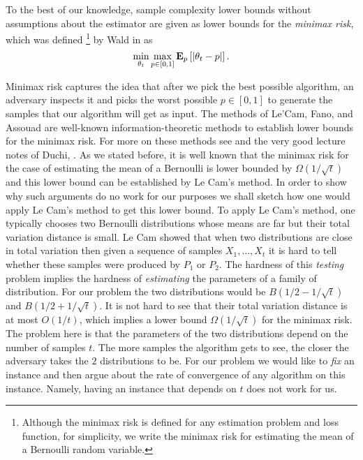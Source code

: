 
To the best of our knowledge, sample complexity lower bounds without
assumptions about the estimator are given as lower bounds for the
\emph{minimax risk}, which was defined
\footnote{
  Although the minimax risk is defined for any estimation problem and loss
  function, for simplicity, we write the minimax risk for estimating the mean
  of a Bernoulli random variable.}
by Wald in \cite{Wal39} as
\[
  \min_{\theta_t} \max_{p\in[0,1]} \bm{\mathrm{E}}_{p} \left[ |\theta_t - p| \right].
\]

Minimax risk captures the idea that after we pick the best possible
algorithm, an adversary inspects it and picks the worst possible
$p \in[0,1]$ to generate the samples that our algorithm will get as input.
The methods of Le'Cam, Fano, and Assouad are well-known
information-theoretic methods to establish lower bounds for the minimax risk.
For more on these methods see \cite{Yu97, Tsy08} and the
very good lecture notes of Duchi, \cite{duchi_stats311}.
As we stated before, it is well known that the minimax risk for the
case of estimating the mean of a Bernoulli is lower bounded by
$\Omega(1/\sqrt{t})$ and this lower bound can be established
by Le Cam's method.
In order to show why such arguments do no work for our purposes
we shall sketch how one would apply Le Cam's method to get this lower bound.
To apply Le Cam's method, one typically chooses two Bernoulli distributions
whose means are far but their total variation distance is small.
Le Cam showed that when two distributions are close in total variation then
given a sequence of samples $X_1, \ldots, X_t$ it is hard to tell whether
these samples were produced by $P_1$ or $P_2$. The hardness of this \emph{testing}
problem implies the hardness of \emph{estimating} the parameters of
a family of distribution.
For our problem the two distributions would be $B(1/2 - 1/\sqrt{t})$
and $B(1/2 + 1/\sqrt{t})$. It is not hard to see that their total variation
distance is at most $O(1/t)$, which implies a lower bound
$\Omega(1/\sqrt{t})$ for the minimax risk. The problem here is that
the parameters of the two distributions depend on the number of
samples $t$. The more samples the algorithm gets to see, the closer
the adversary takes the $2$ distributions to be.
For our problem we would like to \emph{fix} an instance and then argue
about the rate of convergence of any algorithm on this instance.
Namely, having an instance that depends on $t$ does not work for us.

